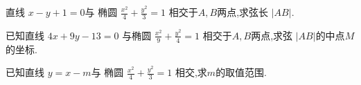 \documentclass{ctexart}
\begin{document}
直线 $x-y+1=0$与 椭圆 $\frac{x^2}{4}+\frac{y^2}{3}=1$ 相交于$A,B$两点,求弦长 $|AB|$.





已知直线 $4x+9y-13=0$ 与椭圆 $\frac{x^2}{9}+\frac{y^2}{4}=1$ 相交于$A,B$两点,求弦 $|AB|$的中点$M$的坐标.






已知直线 $y=x-m$与 椭圆 $\frac{x^2}{4}+\frac{y^2}{3}=1$ 相交,求$m$的取值范围.
\end{document}
